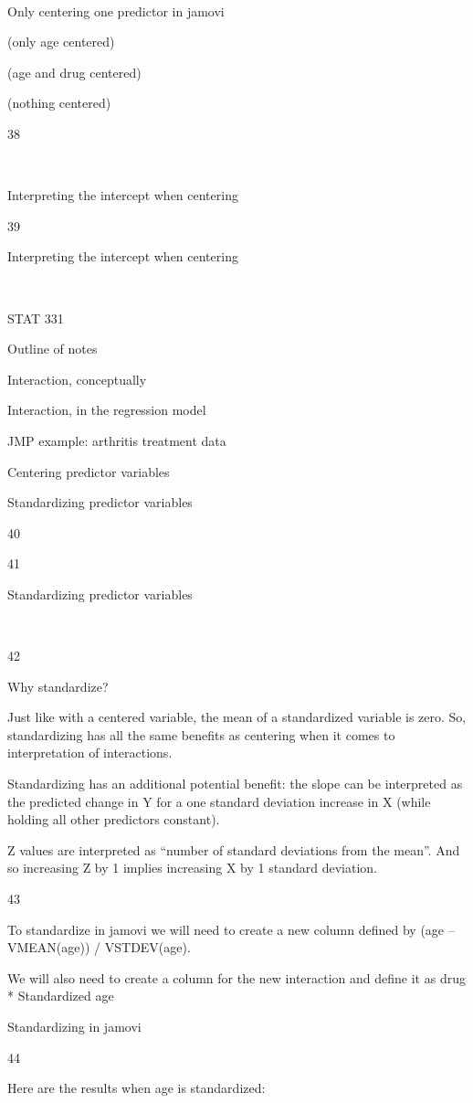 \documentclass[
  letterpaper,
  DIV=11,
  numbers=noendperiod]{scrreprt}
\begin{document}
~

Only centering one predictor in jamovi

(only age centered)

(age and drug centered)

(nothing centered)

38

~

Interpreting the intercept when centering

39

Interpreting the intercept when centering

~

STAT 331

Outline of notes

Interaction, conceptually

Interaction, in the regression model

JMP example: arthritis treatment data

Centering predictor variables

Standardizing predictor variables

40

41

Standardizing predictor variables

~

42

Why standardize?

Just like with a centered variable, the mean of a standardized variable
is zero. So, standardizing has all the same benefits as centering when
it comes to interpretation of interactions.

Standardizing has an additional potential benefit: the slope can be
interpreted as the predicted change in Y for a one standard deviation
increase in X (while holding all other predictors constant).

Z values are interpreted as ``number of standard deviations from the
mean''. And so increasing Z by 1 implies increasing X by 1 standard
deviation.

43

To standardize in jamovi we will need to create a new column defined by
(age -- VMEAN(age)) / VSTDEV(age).

We will also need to create a column for the new interaction and define
it as drug * Standardized age

Standardizing in jamovi

44

Here are the results when age is standardized:
\end{document}
